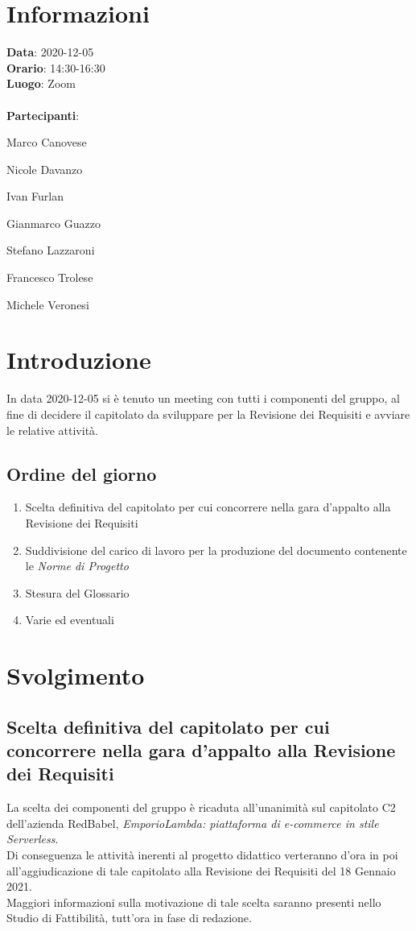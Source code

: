 \section{Informazioni}
\textbf{Data}: 2020-12-05\\
\textbf{Orario}: 14:30-16:30\\
\textbf{Luogo}: Zoom\\\\
\textbf{Partecipanti}:\begin{list}{*}{\setlength{\itemsep}{0cm}}
	\item Marco Canovese
	\item Nicole Davanzo
	\item Ivan Furlan
	\item Gianmarco Guazzo
	\item Stefano Lazzaroni
	\item Francesco Trolese
	\item Michele Veronesi
\end{list}

\section{Introduzione}
In data 2020-12-05 si è tenuto un meeting con tutti i componenti del gruppo, al fine
di decidere il capitolato da sviluppare per la Revisione dei Requisiti e avviare le relative attività.

\subsection{Ordine del giorno}
\begin{enumerate}
    \item Scelta definitiva del capitolato per cui concorrere nella gara d'appalto alla Revisione dei Requisiti
    \item Suddivisione del carico di lavoro per la produzione del documento contenente le \textit{Norme di Progetto}
    \item Stesura del Glossario
    \item Varie ed eventuali
\end{enumerate}

\section{Svolgimento}
\subsection{Scelta definitiva del capitolato per cui concorrere nella gara d'appalto alla Revisione dei Requisiti}
	La scelta dei componenti del gruppo è ricaduta all'unanimità sul capitolato C2 dell'azienda RedBabel, \textit{EmporioLambda: piattaforma di e-commerce in stile Serverless}.\\
	Di conseguenza le attività inerenti al progetto didattico verteranno d'ora in poi all'aggiudicazione di tale capitolato alla Revisione dei Requisiti del 18 Gennaio 2021.\\
	Maggiori informazioni sulla motivazione di tale scelta saranno presenti nello Studio di Fattibilità, tutt'ora in fase di redazione.



